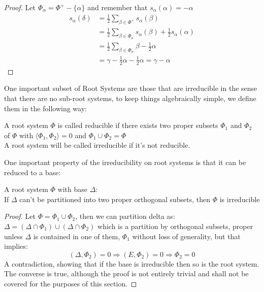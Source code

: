 \begin{proof}
	Let $\Phi_\alpha = \Phi^+-\{\alpha\}$ and remember that $s_\alpha(\alpha)=-\alpha$
	\begin{align*}
		s_\alpha(\delta) &= \displaystyle \frac{1}{2}\sum_{\beta \in \Phi^+} s_\alpha(\beta)\\
		&= \displaystyle \frac{1}{2}\sum_{\beta \in \Phi_\alpha}  s_\alpha(\beta) + \frac{1}{2}s_\alpha(\alpha)\\
		&= \frac{1}{2}\sum_{\beta \in \Phi_\alpha} \beta - \frac{1}{2}\alpha\\
		&= \gamma - \frac{1}{2}\alpha - \frac{1}{2} \alpha = \gamma-\alpha
	\end{align*}
\end{proof}

One important subset of Root Systems are those that are irreducible in the sense that there are no sub-root systems, to keep things algebraically simple, we define them in the following way:
\begin{defi}
	\label{irredRS}
	A root system $\Phi$ is called reducible if there exists two proper subsets $\Phi_1$ and $\Phi_2$ of $\Phi$ with $\langle \Phi_1,\Phi_2 \rangle = 0$ and $\Phi_1 \cup \Phi_2 = \Phi$\\
	A root system will be called irreducible if it's not reducible.
\end{defi}
One important property of the irreducibility on root systems is that it can be reduced to a base:
\begin{prop}
	A root system $\Phi$ with base $\Delta$:\\
	If $\Delta$ can't be partitioned into two proper orthogonal subsets, then $\Phi$ is irreducible
	\label{irbaseimplyirroot}
\end{prop}
\begin{proof}
	Let $\Phi = \Phi_1 \cup \Phi_2$, then we can partition delta as: $\Delta = (\Delta \cap \Phi_1) \cup (\Delta \cap \Phi_2)$ which is a partition by orthogonal subsets, proper unless $\Delta$ is contained in one of them,  $\Phi_1$ without loss of generality, but that implies:
	$$(\Delta,\Phi_2) = 0 \Rightarrow (E,\Phi_2) = 0 \Rightarrow \Phi_2 = 0$$
	A contradiction, showing that if the base is irreducible then so is the root system.\\
	The converse is true, although the proof is not entirely trivial and shall not be covered for the purposes of this section.
\end{proof}
